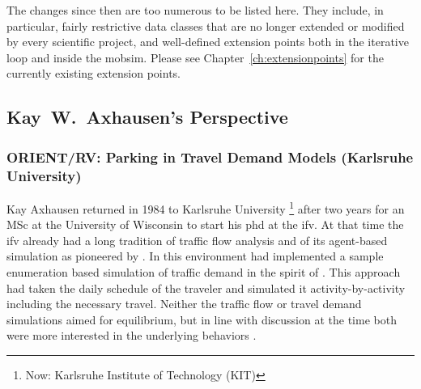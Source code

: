 The changes since then are too numerous to be listed here.  They include, in particular, fairly restrictive data classes that are no longer extended or modified by every scientific project, and well-defined extension points both in the iterative loop and inside the \gls{mobsim}.  Please see Chapter~\ref{ch:extensionpoints} for the currently existing extension points.


\subsection{Kay~W.~Axhausen's Perspective}
\subsubsection{ORIENT/RV: Parking in Travel Demand Models (Karlsruhe University)}
Kay Axhausen returned in 1984 to Karlsruhe University%
\footnote{
Now: Karlsruhe Institute of Technology (KIT)
}
after two years for an MSc at the University of Wisconsin to start his \acrshort{phd} at the \gls{ifv}. At that time the \gls{ifv} already had a long tradition of traffic flow analysis \citep[][]{Leutzbach1972Buch} and of its agent-based simulation as pioneered by \citet[][]{Wiedemann_PhDThesis_1974} \citep[see also][]{LeutzbachWiedemann_TEC_1986}. In this environment \citet[][]{Sparmann_TechRep_1980} had implemented a sample enumeration based simulation of traffic demand in the spirit of \citet[][]{PoeckZumkeller_PTRC_1978}. This approach had taken the daily schedule of the traveler and simulated it activity-by-activity including the necessary travel. Neither the traffic flow or travel demand simulations aimed for equilibrium, but in line with discussion at the time both were more interested in the underlying behaviors \citep[e.g.,][]{JonesEtAl_1983}.

